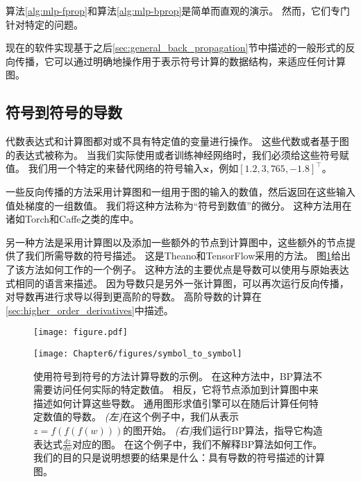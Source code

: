 算法\ref{alg:mlp-fprop}和算法\ref{alg:mlp-bprop}是简单而直观的演示。
然而，它们专门针对特定的问题。

现在的软件实现基于之后\ref{sec:general_back_propagation}节中描述的一般形式的反向传播，它可以通过明确地操作用于表示符号计算的数据结构，来适应任何计算图。



\subsection{符号到符号的导数}
\label{sec:symbol_to_symbol_derivatives}

代数表达式和计算图都对或不具有特定值的变量进行操作。
这些代数或者基于图的表达式被称为。
当我们实际使用或者训练神经网络时，我们必须给这些符号赋值。
我们用一个特定的来替代网络的符号输入$\bm{x}$，例如$[1.2, 3,765, -1.8]^\top$。

一些反向传播的方法采用计算图和一组用于图的输入的数值，然后返回在这些输入值处梯度的一组数值。
我们将这种方法称为``符号到数值''的微分。
这种方法用在诸如Torch\citep{Torch-2011}和Caffe\citep{Jia13caffe}之类的库中。

 
另一种方法是采用计算图以及添加一些额外的节点到计算图中，这些额外的节点提供了我们所需导数的符号描述。
这是Theano\citep{bergstra+al:2010-scipy-small,Bastien-Theano-2012}和TensorFlow\citep{tensorflow}采用的方法。
图\ref{fig:chap6_symbol_to_symbol}给出了该方法如何工作的一个例子。
这种方法的主要优点是导数可以使用与原始表达式相同的语言来描述。
因为导数只是另外一张计算图，可以再次运行反向传播，对导数再进行求导以得到更高阶的导数。
高阶导数的计算在\ref{sec:higher_order_derivatives}中描述。
\begin{figure}[!htb]
\ifOpenSource
\centerline{\texttt{[image: figure.pdf]}}
\else
\centerline{\texttt{[image: Chapter6/figures/symbol\_to\_symbol]}}
\fi
\captionsetup{singlelinecheck=off}
\caption{使用符号到符号的方法计算导数的示例。
在这种方法中，\gls{BP}算法不需要访问任何实际的特定数值。
相反，它将节点添加到计算图中来描述如何计算这些导数。
通用图形求值引擎可以在随后计算任何特定数值的导数。
\emph{(左)}在这个例子中，我们从表示$z=f(f(f(w)))$的图开始。
\emph{(右)}我们运行\gls{BP}算法，指导它构造表达式$\frac{dz}{dw}$对应的图。 在这个例子中，我们不解释\gls{BP}算法如何工作。
我们的目的只是说明想要的结果是什么：具有导数的符号描述的计算图。}
\label{fig:chap6_symbol_to_symbol}
\end{figure}

